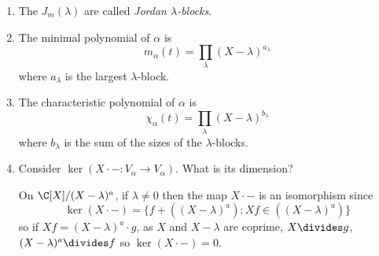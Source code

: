 \documentclass[a4paper]{article}
\begin{document}
\begin{remark}\leavevmode
  \begin{enumerate}
  \item The \(J_m(\lambda)\) are called \emph{Jordan \(\lambda\)-blocks}.
  \item The minimal polynomial of \(\alpha\) is
    \[
      m_\alpha(t) = \prod_\lambda (X - \lambda)^{a_\lambda}
    \]
    where \(a_\lambda\) is the largest \(\lambda\)-block.
  \item The characteristic polynomial of \(\alpha\) is
    \[
      \chi_\alpha(t) = \prod_\lambda (X - \lambda)^{b_\lambda}
    \]
    where \(b_\lambda\) is the sum of the sizes of the \(\lambda\)-blocks.
  \item Consider \(\ker (X \cdot -: V_\alpha \to V_\alpha)\). What is its dimension?

    On \(\C[X]/(X - \lambda)^a\), if \(\lambda \neq 0\) then the map \(X \cdot -\) is an isomorphism since
    \[
      \ker (X \cdot -) = \{f + ((X - \lambda)^a): Xf \in ((X - \lambda)^a)\}
    \]
    so if \(Xf = (X - \lambda)^a \cdot g\), as \(X\) and \(X - \lambda\) are coprime, \(X \divides g\), \((X - \lambda)^a \divides f\) so \(\ker (X \cdot -) = 0\).


\end{enumerate}
\end{remark}
\end{document}
